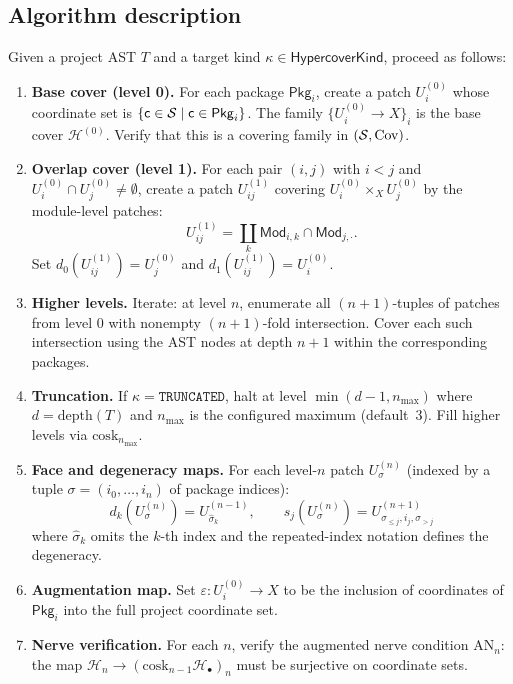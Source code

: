 \documentclass[11pt]{article}
\newcommand{\HC}{\mathcal{H}}              %
\newcommand{\HClev}[1]{\HC^{(#1)}}        %
\newcommand{\HCK}{\mathsf{HypercoverKind}} %
\newcommand{\AugNerve}{\mathrm{AN}}        %
\newcommand{\cosk}{\mathrm{cosk}}          %
\newcommand{\face}[1]{d_{#1}}             %
\newcommand{\degen}[1]{s_{#1}}            %
\newcommand{\aug}{\varepsilon}             %
\newcommand{\Pkg}{\mathsf{Pkg}}           %
\newcommand{\Mod}{\mathsf{Mod}}           %
\newcommand{\depth}{\mathrm{depth}}       %
\newcommand{\KindTrunc}{\texttt{TRUNCATED}}
\begin{document}
\subsection{Algorithm description}

\begin{construction}\label{cons:algo}
Given a project AST $T$ and a target kind $\kappa \in \HCK$, proceed as
follows:

\begin{enumerate}[label=\arabic*.]
  \item \textbf{Base cover (level 0).}
    For each package $\Pkg_i$, create a patch $U_i^{(0)}$ whose
    coordinate set is $\{\coord \in \Site \mid \coord \in \Pkg_i\}$.
    The family $\{U_i^{(0)} \to X\}_{i}$ is the base cover $\HClev{0}$.
    Verify that this is a covering family in $(\mathcal{S}, \mathrm{Cov})$.

  \item \textbf{Overlap cover (level 1).}
    For each pair $(i, j)$ with $i < j$ and $U_i^{(0)} \cap U_j^{(0)} \ne
    \emptyset$, create a patch $U_{ij}^{(1)}$ covering
    $U_i^{(0)} \times_X U_j^{(0)}$ by the module-level patches:
    \[
      U_{ij}^{(1)} = \coprod_{k} \Mod_{i,k} \cap \Mod_{j, \cdot}.
    \]
    Set $\face{0}(U_{ij}^{(1)}) = U_j^{(0)}$ and
    $\face{1}(U_{ij}^{(1)}) = U_i^{(0)}$.

  \item \textbf{Higher levels.}
    Iterate: at level $n$, enumerate all $(n{+}1)$-tuples of patches
    from level $0$ with nonempty $(n{+}1)$-fold intersection.  Cover
    each such intersection using the AST nodes at depth $n{+}1$
    within the corresponding packages.

  \item \textbf{Truncation.}
    If $\kappa = \KindTrunc$, halt at level $\min(d{-}1, n_{\max})$
    where $d = \depth(T)$ and $n_{\max}$ is the configured maximum
    (default~3).  Fill higher levels via $\cosk_{n_{\max}}$.

  \item \textbf{Face and degeneracy maps.}
    For each level-$n$ patch $U^{(n)}_\sigma$ (indexed by a tuple
    $\sigma = (i_0, \ldots, i_n)$ of package indices):
    \[
      \face{k}(U^{(n)}_\sigma)
        = U^{(n-1)}_{\hat\sigma_k},
      \qquad
      \degen{j}(U^{(n)}_\sigma)
        = U^{(n+1)}_{\sigma_{\le j}, i_j, \sigma_{> j}}
    \]
    where $\hat\sigma_k$ omits the $k$-th index and the repeated-index
    notation defines the degeneracy.

  \item \textbf{Augmentation map.}
    Set $\aug : U^{(0)}_i \to X$ to be the inclusion of
    coordinates of $\Pkg_i$ into the full project coordinate set.

  \item \textbf{Nerve verification.}
    For each $n$, verify the augmented nerve condition
    $\AugNerve_n$: the map
    $\HC_n \to (\cosk_{n-1}\HC_\bullet)_n$ must be surjective on
    coordinate sets.
\end{enumerate}
\end{construction}
\end{document}
